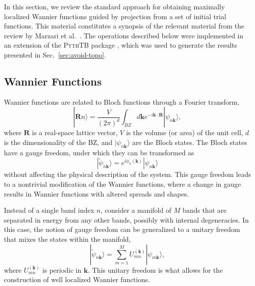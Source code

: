 \documentclass[galley,aps,pra,10pt,amsmath,amssymb,
    superscriptaddress,nofootinbib,longbibliography]{revtex4-2}
\newcounter{comm}
\newcommand{\sref}[1]{Sec.~\ref{sec:#1}}
\newcommand{\code}[1]{\textsc{#1}}
\begin{document}
In this section, we review the standard approach for obtaining maximally localized Wannier functions guided by projection from a set of initial trial functions. This material constitutes a synopsis of the relevant material from the review by Marzari et al.~\cite{marzari2012}. The operations described below were implemented in an extension of the \code{PythTB} package \cite{pythtb}, which was used to generate the results presented in \sref{avoid-topo}.

\subsection{Wannier Functions}

Wannier functions are related to Bloch functions through a Fourier transform,
\begin{equation}
    |\mathbf{R} n\rangle = \frac{V}{(2\pi)^d} \int_{BZ} d\mathbf{k} e^{-i\mathbf{k}\cdot \mathbf{R}} |\psi_{n\mathbf{k}}\rangle,
\end{equation}
where $\mathbf{R}$ is a real-space lattice vector, $V$ is the volume (or area) of the unit cell, $d$ is the dimensionality of the BZ, and $|\psi_{n\mathbf{k}}\rangle$ are the Bloch states. The Bloch states have a gauge freedom, under which they can be transformed as
\begin{equation}
    |\tilde{\psi}_{n\mathbf{k}}\rangle = e^{i\phi_n(\mathbf{k})} |\psi_{n\mathbf{k}}\rangle
\end{equation}
without affecting the physical description of the system. This gauge freedom leads to a nontrivial modification of the Wannier functions, where a change in gauge results in Wannier functions with altered spreads and shapes.

Instead of a single band index $n$, consider a manifold of $M$ bands that are separated in energy from any other bands, possibly with internal degeneracies. In this case, the notion of gauge freedom can be generalized to a unitary freedom that mixes the states within the manifold,
\begin{equation}
    |\tilde{\psi}_{n\mathbf{k}}\rangle = \sum_{m=1}^{M} U_{mn}^{(\mathbf{k})} |\psi_{m\mathbf{k}} \rangle ,
\end{equation}
where $U_{mn}^{(\mathbf{k})}$ is periodic in $\mathbf{k}$. This unitary freedom is what allows for the construction of well localized Wannier functions. 
\end{document}
